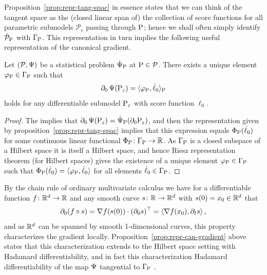 \documentclass[a4,danish]{article}
\begin{document}
Proposition~\ref{prop:repr-tang-spac} in essence states that we can think of the tangent space as
the (closed linear span of) the collection of score functions for all parametric submodels
$\mathcal{P}_{\epsilon}$ passing through $\P$; hence we shall often simply identify
$\dot{\mathcal{P}}_{\P}$ with $\Gamma_{\P}$. This representation in turn implies the following
useful representation of the canonical gradient.

\begin{proposition}
  \label{prop:repr-can-gradient}
  Let $(\mathcal{P}, \TT)$ be a statistical problem 
  $\dot{\mathcal{\TT}}_{\P}$ at $\P \in \mathcal{P}$. There exists a
  unique element $\phi_{\P} \in \Gamma_{\P}$ such that
  \begin{equation}
    \label{eq:2}
    \partial_0 \TT(\P_{\epsilon})
    = \langle \phi_{\P}, \dot{\ell}_0 \rangle_{\P}
  \end{equation}
  holds for any differentiable submodel $\P_{\epsilon}$ with score function $\dot{\ell}_0$.
\end{proposition}

\begin{proof}
  The 
  implies that $\partial_0 \TT(\P_{\epsilon}) = \dot{\TT}_{\P}(\partial_0 \P_{\epsilon})$, and then
  the representation given by proposition~\ref{prop:repr-tang-spac} implies that this expression
  equals $\Phi_{\P}(\dot{\ell}_0)$ for some continuous linear functional
  $\Phi_{\P} \colon \Gamma_{\P} \rightarrow \R$. As $\Gamma_{\P}$ is a closed subspace of a Hilbert
  space it is itself a Hilbert space, and hence Riesz representation theorem (for Hilbert spaces)
  gives the existence of a unique element $\phi_{\P} \in \Gamma_{\P}$ such that
  $\Phi_{\P}(\dot{\ell}_0) = \langle\phi_{\P}, \dot{\ell}_0\rangle$ for all elements
  $\dot{\ell}_0 \in \Gamma_{\P}$.
\end{proof}

By the chain rule of ordinary multivariate calculus we have for a differentiable function
$f\colon\R^d \rightarrow \R$ and any smooth curve $s\colon\R\rightarrow \R^d$ with
$s(0) = x_0 \in \R^d$ that
\begin{equation*}
  \partial_{0} (f\circ s) = \nabla f(s(0)) \cdot (\partial_{0}s )^{\T}
  =
  \left\langle
    \nabla f(x_0) ,  \partial_{t}s 
  \right\rangle,
\end{equation*}
and as $\R^d$ can be spanned by smooth 1-dimensional curves, this property characterizes the
gradient locally. Proposition~\ref{prop:repr-can-gradient} above states that this characterization
extends to the Hilbert space setting with Hadamard differentiability, and in fact this
characterization  Hadamard differentiability
of the map $\TT$ tangential to $\Gamma_{\P}$ \citep[A.5]{bickel1993efficient}.
\end{document}
